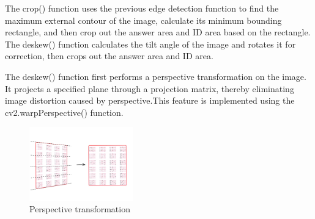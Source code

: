 \documentclass[twocolumn]{article}
\begin{document}
        The crop() function uses the previous edge detection function to find the maximum external contour of the image, calculate its minimum bounding rectangle, and then crop out the answer area and ID area based on the rectangle. The deskew() function calculates the tilt angle of the image and rotates it for correction, then crops out the answer area and ID area.

        The deskew() function first performs a perspective transformation on the image. It projects a specified plane through a projection matrix, thereby eliminating image distortion caused by perspective.This feature is implemented using the cv2.warpPerspective() function.

        \begin{figure}[ht]
            \centering
            \includegraphics[width=0.4\textwidth]{perspective_transform.png}
            \caption{Perspective transformation}
            \label{fig:perspective_transform}
        \end{figure}
\end{document}
